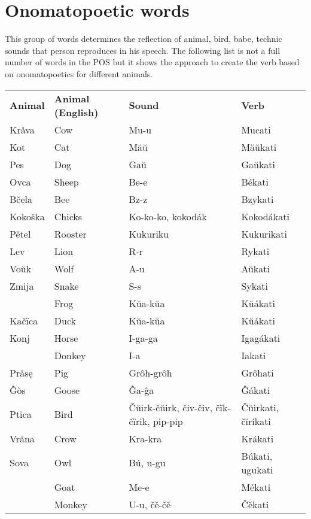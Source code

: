 \section{Onomatopoetic words}

This group of words determines the reflection of animal, bird, babe, technic sounds that person reproduces in his speech. The following list is not a full number of words in the POS but it shows the approach to create the verb based on onomatopoetics for different animals.

\begin{table}
	\begin{tabular}{lp{4em}p{7em}p{7em}}
		\textbf{Animal} & \textbf{Animal (English)} & \textbf{Sound} & \textbf{Verb} \\
		Kråva & Cow & Mu-u & Mucati \\
		Kot & Cat & Mäŭ & Mäŭkati \\
		Pes & Dog & Gaŭ & Gaŭkati \\
		Ovca & Sheep & Be-e & Békati \\
		Bčela & Bee & Bz-z & Bzykati \\
		Kokoška & Chicks & Ko-ko-ko, kokodák & Kokodákati \\
		Pětel & Rooster & Kukuriku & Kukurikati \\
		Lev & Lion & R-r & Rykati \\
		Voŭk & Wolf & A-u & Aŭkati \\
		Zmija & Snake & S-s & Sykati \\
		& Frog & Kŭa-kŭa & Kŭákati \\
		Kačïca & Duck & Kŭa-kŭa & Kŭákati \\
		Konj & Horse & I-ga-ga & Igagákati \\
		& Donkey & I-a & Iakati \\
		Pråsę & Pig & Grôh-grôh & Grôhati \\
		Ĝòs & Goose & Ĝa-ĝa & Ĝákati \\
		Ptica & Bird & Čŭirk-čŭirk, čiv-čiv, čïk-čïrik, pip-pip & Čŭirkati, čïrikati \\
		Vråna & Crow & Kra-kra & Krákati \\
		Sova & Owl & Bú, u-gu & Búkati, ugukati \\
		& Goat & Me-e & Mékati \\
		& Monkey & U-u, čě-čě & Čěkati \\
	\end{tabular}
\end{table}

